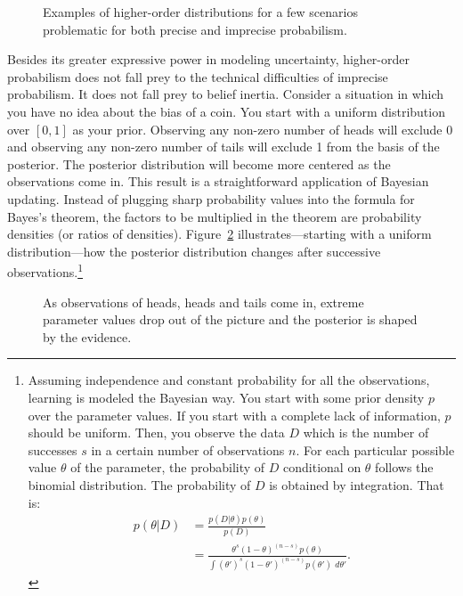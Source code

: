 \documentclass[
  letterpaper,
  DIV=11,
  numbers=noendperiod]{scrartcl}
\begin{document}
\begin{figure}[t]


\caption{\label{fig-evidenceResponse}Examples of higher-order
distributions for a few scenarios problematic for both precise and
imprecise probabilism.}

\end{figure}%

Besides its greater expressive power in modeling uncertainty,
higher-order probabilism does not fall prey to the technical
difficulties of imprecise probabilism. It does not fall prey to belief
inertia. Consider a situation in which you have no idea about the bias
of a coin. You start with a uniform distribution over \([0,1]\) as your
prior. Observing any non-zero number of heads will exclude 0 and
observing any non-zero number of tails will exclude 1 from the basis of
the posterior. The posterior distribution will become more centered as
the observations come in. This result is a straightforward application
of Bayesian updating. Instead of plugging sharp probability values into
the formula for Bayes's theorem, the factors to be multiplied in the
theorem are probability densities (or ratios of densities).
Figure~\ref{fig-intertia2} illustrates---starting with a uniform
distribution---how the posterior distribution changes after successive
observations.\footnote{Assuming independence and constant probability
  for all the observations, learning is modeled the Bayesian way. You
  start with some prior density \(p\) over the parameter values. If you
  start with a complete lack of information, \(p\) should be uniform.
  Then, you observe the data \(D\) which is the number of successes
  \(s\) in a certain number of observations \(n\). For each particular
  possible value \(\theta\) of the parameter, the probability of \(D\)
  conditional on \(\theta\) follows the binomial distribution. The
  probability of \(D\) is obtained by integration. That is:
  \begin{align*}
  p(\theta \vert D) & = \frac{p(D\vert \theta)p(\theta)}{p(D)}\\
  & = \frac{\theta^s (1-\theta)^{(n - s)}p(\theta)}{\int (\theta')^s (1-\theta')^{(n - s)}p(\theta')\,\, d\theta'}.
  \end{align*}}

\begin{figure}


\caption{\label{fig-intertia2}As observations of heads, heads and tails
come in, extreme parameter values drop out of the picture and the
posterior is shaped by the evidence.}

\end{figure}%
\end{document}
